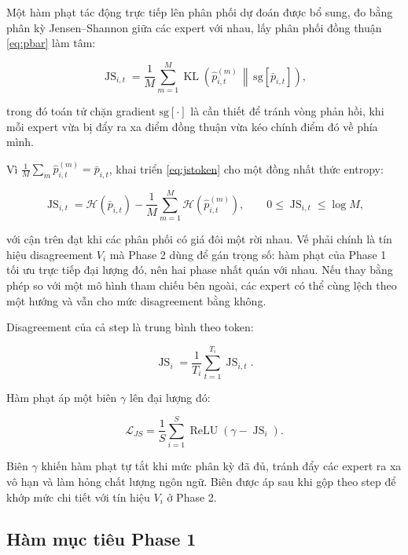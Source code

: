 \documentclass[12pt,a4paper]{article}
\DeclareMathOperator{\KL}{KL}
\DeclareMathOperator{\JS}{JS}
\DeclareMathOperator{\ReLU}{ReLU}
\newcommand{\sg}[1]{\mathrm{sg}\!\left[#1\right]}
\begin{document}
Một hàm phạt tác động trực tiếp lên phân phối dự đoán được bổ sung, đo bằng phân kỳ Jensen--Shannon giữa các expert với nhau, lấy phân phối đồng thuận \eqref{eq:pbar} làm tâm:

\begin{equation}
\label{eq:jstoken}
\JS_{i,t}
=
\frac{1}{M}\sum_{m=1}^{M}
\KL\!\left(\hat{p}_{i,t}^{(m)} \,\middle\|\, \sg{\bar{p}_{i,t}}\right),
\end{equation}

trong đó toán tử chặn gradient $\sg{\cdot}$ là cần thiết để tránh vòng phản hồi, khi mỗi expert vừa bị đẩy ra xa điểm đồng thuận vừa kéo chính điểm đó về phía mình.

Vì $\frac{1}{M}\sum_m \hat p_{i,t}^{(m)} = \bar p_{i,t}$, khai triển \eqref{eq:jstoken} cho một đồng nhất thức entropy:

\begin{equation}
\label{eq:jsidentity}
\JS_{i,t}
=
\mathcal{H}\!\left(\bar{p}_{i,t}\right)
-
\frac{1}{M}\sum_{m=1}^{M}\mathcal{H}\!\left(\hat{p}_{i,t}^{(m)}\right),
\qquad 0 \le \JS_{i,t} \le \log M,
\end{equation}

với cận trên đạt khi các phân phối có giá đôi một rời nhau. Vế phải chính là tín hiệu disagreement $V_i$ mà Phase 2 dùng để gán trọng số: hàm phạt của Phase 1 tối ưu trực tiếp đại lượng đó, nên hai phase nhất quán với nhau. Nếu thay bằng phép so với một mô hình tham chiếu bên ngoài, các expert có thể cùng lệch theo một hướng và vẫn cho mức disagreement bằng không.

Disagreement của cả step là trung bình theo token:

\begin{equation}
\label{eq:jsstep}
\JS_i = \frac{1}{T_i}\sum_{t=1}^{T_i}\JS_{i,t}.
\end{equation}

Hàm phạt áp một biên $\gamma$ lên đại lượng đó:

\begin{equation}
\label{eq:jssteploss}
\mathcal{L}_{JS}
=
\frac{1}{S}\sum_{i=1}^{S} \ReLU\!\left(\gamma - \JS_i\right).
\end{equation}

Biên $\gamma$ khiến hàm phạt tự tắt khi mức phân kỳ đã đủ, tránh đẩy các expert ra xa vô hạn và làm hỏng chất lượng ngôn ngữ. Biên được áp sau khi gộp theo step để khớp mức chi tiết với tín hiệu $V_i$ ở Phase 2.

\subsection{Hàm mục tiêu Phase 1}
\end{document}
